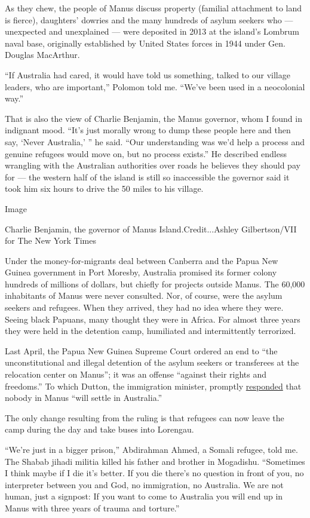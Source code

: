 As they chew, the people of Manus discuss property (familial attachment
to land is fierce), daughters' dowries and the many hundreds of asylum
seekers who --- unexpected and unexplained --- were deposited in 2013 at
the island's Lombrum naval base, originally established by United States
forces in 1944 under Gen. Douglas MacArthur.

``If Australia had cared, it would have told us something, talked to our
village leaders, who are important,'' Polomon told me. ``We've been used
in a neocolonial way.''

That is also the view of Charlie Benjamin, the Manus governor, whom I
found in indignant mood. ``It's just morally wrong to dump these people
here and then say, `Never Australia,' '' he said. ``Our understanding
was we'd help a process and genuine refugees would move on, but no
process exists.'' He described endless wrangling with the Australian
authorities over roads he believes they should pay for --- the western
half of the island is still so inaccessible the governor said it took
him six hours to drive the 50 miles to his village.

Image

Charlie Benjamin, the governor of Manus Island.Credit...Ashley
Gilbertson/VII for The New York Times

Under the money-for-migrants deal between Canberra and the Papua New
Guinea government in Port Moresby, Australia promised its former colony
hundreds of millions of dollars, but chiefly for projects outside Manus.
The 60,000 inhabitants of Manus were never consulted. Nor, of course,
were the asylum seekers and refugees. When they arrived, they had no
idea where they were. Seeing black Papuans, many thought they were in
Africa. For almost three years they were held in the detention camp,
humiliated and intermittently terrorized.

Last April, the Papua New Guinea Supreme Court ordered an end to ``the
unconstitutional and illegal detention of the asylum seekers or
transferees at the relocation center on Manus''; it was an offense
``against their rights and freedoms.'' To which Dutton, the immigration
minister, promptly
\href{http://www.nytimes.com/2016/04/27/world/australia/papua-new-guinea-asylum-seeker.html}{responded}
that nobody in Manus ``will settle in Australia.''

The only change resulting from the ruling is that refugees can now leave
the camp during the day and take buses into Lorengau.

``We're just in a bigger prison,'' Abdirahman Ahmed, a Somali refugee,
told me. The Shabab jihadi militia killed his father and brother in
Mogadishu. ``Sometimes I think maybe if I die it's better. If you die
there's no question in front of you, no interpreter between you and God,
no immigration, no Australia. We are not human, just a signpost: If you
want to come to Australia you will end up in Manus with three years of
trauma and torture.''

